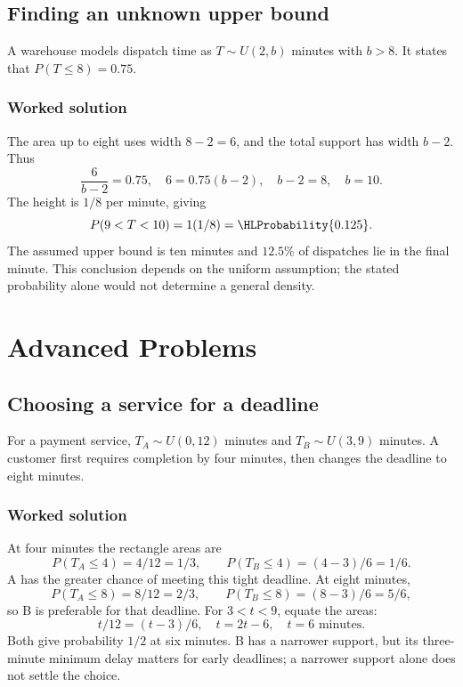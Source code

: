 \subsection{Finding an unknown upper bound}\label{prob:sec:general-worked2}
A warehouse models dispatch time as $T\sim U(2,b)$ minutes with $b>8$. It states that $P(T\le8)=0.75$.
\subsubsection*{Worked solution}\label{sol:sec:general-worked2}
The area up to eight uses width $8-2=6$, and the total support has width $b-2$. Thus
\[
\frac{6}{b-2}=0.75,\quad 6=0.75(b-2),\quad b-2=8,\quad b=10.
\]
The height is $1/8$ per minute, giving
\[
P(9<T<10)=1(1/8)=\HLProbability{0.125}.
\]
The assumed upper bound is ten minutes and $12.5\%$ of dispatches lie in the final minute. This conclusion depends on the uniform assumption; the stated probability alone would not determine a general density.
\section{Advanced Problems}\label{sec:advanced}

\subsection{Choosing a service for a deadline}\label{prob:sec:advanced0}
For a payment service, $T_A\sim U(0,12)$ minutes and $T_B\sim U(3,9)$ minutes. A customer first requires completion by four minutes, then changes the deadline to eight minutes.
\subsubsection*{Worked solution}\label{sol:sec:advanced0}
At four minutes the rectangle areas are
\[
P(T_A\le4)=4/12=1/3,\qquad P(T_B\le4)=(4-3)/6=1/6.
\]
A has the greater chance of meeting this tight deadline. At eight minutes,
\[
P(T_A\le8)=8/12=2/3,\qquad P(T_B\le8)=(8-3)/6=5/6,
\]
so B is preferable for that deadline. For $3<t<9$, equate the areas:
\[
t/12=(t-3)/6,\quad t=2t-6,\quad t=6\text{ minutes}.
\]
Both give probability $1/2$ at six minutes. B has a narrower support, but its three-minute minimum delay matters for early deadlines; a narrower support alone does not settle the choice.



